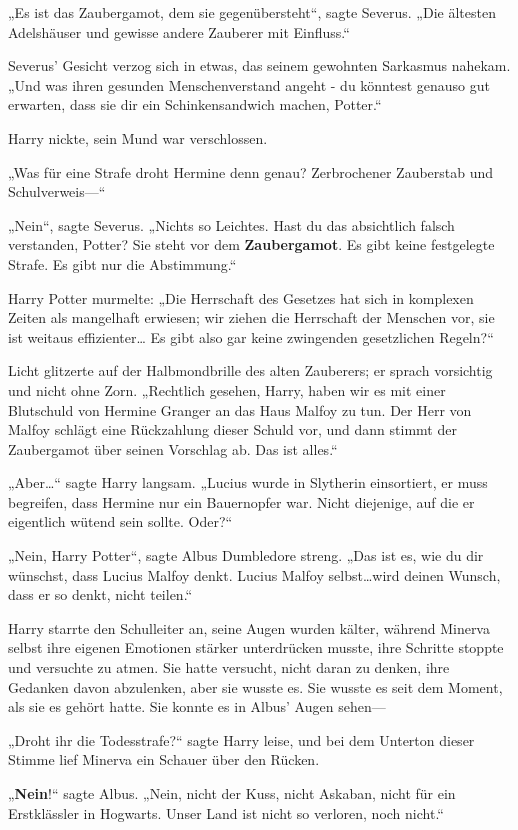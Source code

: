{„Es ist das Zaubergamot, dem sie gegenübersteht“, sagte Severus. „Die ältesten Adelshäuser und gewisse andere Zauberer mit Einfluss.“

Severus' Gesicht verzog sich in etwas, das seinem gewohnten Sarkasmus nahekam. „Und was ihren gesunden Menschenverstand angeht - du könntest genauso gut erwarten, dass sie dir ein Schinkensandwich machen, Potter.“

Harry nickte, sein Mund war verschlossen.

„Was für eine Strafe droht Hermine denn genau? Zerbrochener Zauberstab und Schulverweis—“

„Nein“, sagte Severus. „Nichts so Leichtes. Hast du das absichtlich falsch verstanden, Potter? Sie steht vor dem \textbf{Zaubergamot}. Es gibt keine festgelegte Strafe. Es gibt nur die Abstimmung.“

Harry Potter murmelte: „Die Herrschaft des Gesetzes hat sich in komplexen Zeiten als mangelhaft erwiesen; wir ziehen die Herrschaft der Menschen vor, sie ist weitaus effizienter… Es gibt also gar keine zwingenden gesetzlichen Regeln?“

Licht glitzerte auf der Halbmondbrille des alten Zauberers; er sprach vorsichtig und nicht ohne Zorn. „Rechtlich gesehen, Harry, haben wir es mit einer Blutschuld von Hermine Granger an das Haus Malfoy zu tun. Der Herr von Malfoy schlägt eine Rückzahlung dieser Schuld vor, und dann stimmt der Zaubergamot über seinen Vorschlag ab. Das ist alles.“

„Aber…“ sagte Harry langsam. „Lucius wurde in Slytherin einsortiert, er muss begreifen, dass Hermine nur ein Bauernopfer war. Nicht diejenige, auf die er eigentlich wütend sein sollte. Oder?“

„Nein, Harry Potter“, sagte Albus Dumbledore streng. „Das ist es, wie du dir wünschst, dass Lucius Malfoy denkt. Lucius Malfoy selbst…wird deinen Wunsch, dass er so denkt, nicht teilen.“

Harry starrte den Schulleiter an, seine Augen wurden kälter, während Minerva selbst ihre eigenen Emotionen stärker unterdrücken musste, ihre Schritte stoppte und versuchte zu atmen. Sie hatte versucht, nicht daran zu denken, ihre Gedanken davon abzulenken, aber sie wusste es. Sie wusste es seit dem Moment, als sie es gehört hatte. Sie konnte es in Albus' Augen sehen—

„Droht ihr die Todesstrafe?“ sagte Harry leise, und bei dem Unterton dieser Stimme lief Minerva ein Schauer über den Rücken.

„\textbf{Nein}!“ sagte Albus. „Nein, nicht der Kuss, nicht Askaban, nicht für ein Erstklässler in Hogwarts. Unser Land ist nicht so verloren, noch nicht.“

}
